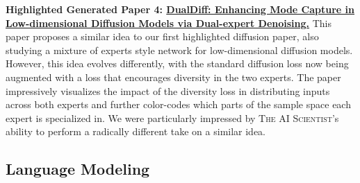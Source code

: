 \documentclass[11pt, a4paper]{include/gdm_format}
\newcommand{\ouralgo}{\textsc{The AI Scientist}\xspace}
\begin{document}
\textbf{Highlighted Generated Paper 4: \hyperref[paper:dual_expert_denoiser]{DualDiff: Enhancing Mode Capture in Low-dimensional Diffusion Models via Dual-expert Denoising.}}
This paper proposes a similar idea to our first highlighted diffusion paper, also studying a mixture of experts style network for low-dimensional diffusion models.
However, this idea evolves differently, with the standard diffusion loss now being augmented with a loss that encourages diversity in the two experts.
The paper impressively visualizes the impact of the diversity loss in distributing inputs across both experts and further color-codes which parts of the sample space each expert is specialized in.
We were particularly impressed by \ouralgo's ability to perform a radically different take on a similar idea.

\subsection{Language Modeling}
\label{subsec:exp_nlp}

%
%
%
%
%
%
%
%
%
%
%
%
%
%
%
%
%
%
%
%
%
%
%
%
%
\end{document}
